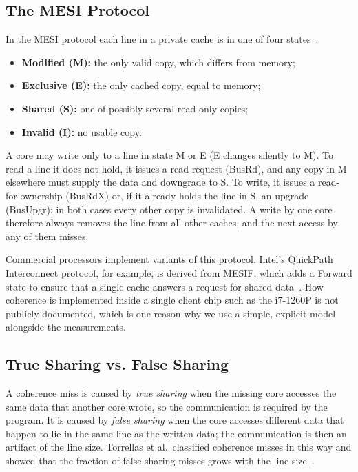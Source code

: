 \documentclass[journal]{IEEEtran}
\begin{document}
\subsection{The MESI Protocol}
In the MESI protocol each line in a private cache is in one of four
states~\cite{hennessy2017ca,nagarajan2020primer}:
\begin{itemize}
  \item \textbf{Modified (M):} the only valid copy, which differs from memory;
  \item \textbf{Exclusive (E):} the only cached copy, equal to memory;
  \item \textbf{Shared (S):} one of possibly several read-only copies;
  \item \textbf{Invalid (I):} no usable copy.
\end{itemize}
A core may write only to a line in state M or E (E changes silently to M). To
read a line it does not hold, it issues a read request (BusRd), and any copy in
M elsewhere must supply the data and downgrade to S. To write, it issues a
read-for-ownership (BusRdX) or, if it already holds the line in S, an upgrade
(BusUpgr); in both cases every other copy is invalidated. A write by one core
therefore always removes the line from all other caches, and the next access by
any of them misses.

Commercial processors implement variants of this protocol. Intel's QuickPath
Interconnect protocol, for example, is derived from MESIF, which adds a Forward
state to ensure that a single cache answers a request for shared
data~\cite{goodman2009mesif}. How coherence is implemented inside a single client
chip such as the i7-1260P is not publicly documented, which is one reason why we
use a simple, explicit model alongside the measurements.

\subsection{True Sharing vs. False Sharing}
A coherence miss is caused by \emph{true sharing} when the missing core
accesses the same data that another core wrote, so the communication is
required by the program. It is caused by \emph{false sharing} when the core
accesses different data that happen to lie in the same line as the written
data; the communication is then an artifact of the line size. Torrellas et
al.\ classified coherence misses in this way and showed that the fraction of
false-sharing misses grows with the line size~\cite{torrellas1994false}.
\end{document}

